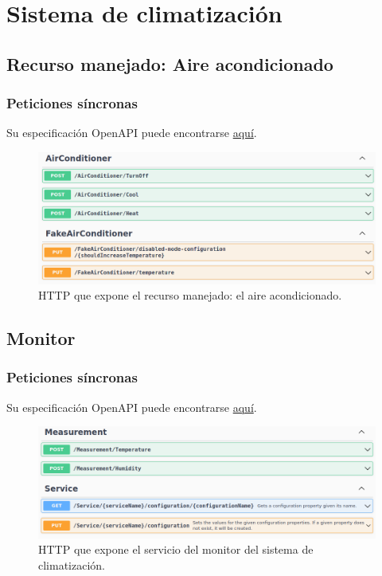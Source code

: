 \section{Sistema de climatización}

\subsection{Recurso manejado: Aire acondicionado}

\subsubsection{Peticiones síncronas}

Su especificación OpenAPI puede encontrarse \href{https://github.com/Starkie/TFM-DistributedAutoadaptiveSystems/blob/1db95346290cb55edbfd5efb717785bcd06def79/src/AutoAdaptativeSystem/Climatisation/AirConditioner/Service/Climatisation.AirConditioner.Service-OpenAPISpec.json}{aquí}.

\begin{figure}[h!]
  \hspace{-0.25cm}
  \includegraphics[scale=0.45]{anx_apis/images/apis-airconditioner}
  \caption{ HTTP que expone el recurso manejado: el aire acondicionado.}
\end{figure}

\subsection{Monitor}

\subsubsection{Peticiones síncronas}

Su especificación OpenAPI puede encontrarse \href{https://github.com/Starkie/TFM-DistributedAutoadaptiveSystems/blob/1db95346290cb55edbfd5efb717785bcd06def79/src/AutoAdaptativeSystem/Climatisation/Monitor/Climatisation.Monitor.Service-OpenAPISpec.json}{aquí}.

\begin{figure}[h!]
  \hspace{-0.25cm}
  \includegraphics[scale=0.45]{anx_apis/images/apis-room-monitor}
  \caption{ HTTP que expone el servicio del monitor del sistema de climatización.}
\end{figure}
